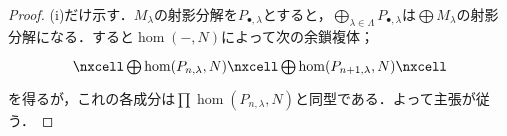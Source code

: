 \begin{proof}
	(i)だけ示す．$M_\lambda$の射影分解を$P_{\bullet,\lambda}$とすると，$\bigoplus_{\lambda\in\Lambda} P_{\bullet,\lambda}$は$\bigoplus M_\lambda$の射影分解になる．すると$\hom(-,N)$によって次の余鎖複体；
	\[\begin{tikzcd}
		\nxcell\bigoplus \hom(P_{n,\lambda},N)\nxcell\bigoplus\hom(P_{n+1,\lambda},N)\nxcell
	\end{tikzcd}\]
	を得るが，これの各成分は$\prod\hom(P_{n,\lambda},N)$と同型である．よって主張が従う．
\end{proof}

%
